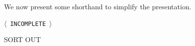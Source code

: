 \documentclass[twoside]{article}
\makeatletter
\theoremstyle{plain}
\theoremstyle{definition}
\newcommand{\dg}[1]{\mathbdcal{#1}}
\newcommand{\IDef}[1]{\mathit{IDef}_{\!#1}}
\newcommand\aar{\@ifstar\aar@one@star\aar@plain}
\newcommand\aar@one@star{\@ifstar\aar@resize{\aar@plain*}}
\newcommand\aar@resize[1]{\sbox{\aar@content}{#1}\scaleleftright[3.8ex]
		{\Biggl\langle\!\!\!\!\Biggl\langle}{\usebox{\aar@content}}
		{\Biggr\rangle\!\!\!\!\Biggr\rangle}}
\newcommand{\TODO}[1][INCOMPLETE]{{\centering\Large\color{red}$\langle$~\texttt{#1}~$\rangle$\par}}
\makeatother
\begin{document}




We now present some shorthand to simplify the presentation.  

\TODO{SORT OUT}
\end{document}
